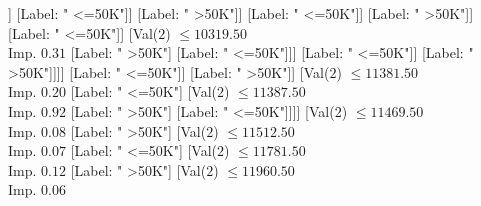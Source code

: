 \documentclass[margin=10pt]{standalone}
\begin{document}
\begin{forest}
																																[Val($2$) $ \leq 10352.50$ \\ Imp. $0.02$
																																	[Val($2$) $ \leq 10308.50$ \\ Imp. $0.10$
																																		[Val($2$) $ \leq 10254.50$ \\ Imp. $0.11$
																																			[Val($2$) $ \leq 10240.50$ \\ Imp. $0.14$
																																				[Val($2$) $ \leq 10143.50$ \\ Imp. $0.15$
																																					[Val($2$) $ \leq 10069.50$ \\ Imp. $0.20$
																																						[Val($2$) $ \leq 10026.50$ \\ Imp. $0.04$
																																							[Val($2$) $ \leq 9898.50$ \\ Imp. $0.31$
																																								[Label: " >50K"]
																																								[Label: " <=50K"]]
																																							[Label: " <=50K"]]
																																						[Label: " >50K"]]
																																					[Label: " <=50K"]]
																																				[Label: " >50K"]]
																																			[Label: " <=50K"]]
																																		[Val($2$) $ \leq 10319.50$ \\ Imp. $0.31$
																																			[Label: " >50K"]
																																			[Label: " <=50K"]]]
																																	[Label: " <=50K"]]
																																[Label: " >50K"]]]]
																													[Label: " <=50K"]]
																												[Label: " >50K"]]
																											[Val($2$) $ \leq 11381.50$ \\ Imp. $0.20$
																												[Label: " <=50K"]
																												[Val($2$) $ \leq 11387.50$ \\ Imp. $0.92$
																													[Label: " >50K"]
																													[Label: " <=50K"]]]]
																										[Val($2$) $ \leq 11469.50$ \\ Imp. $0.08$
																											[Label: " >50K"]
																											[Val($2$) $ \leq 11512.50$ \\ Imp. $0.07$
																												[Label: " <=50K"]
																												[Val($2$) $ \leq 11781.50$ \\ Imp. $0.12$
																													[Label: " >50K"]
																													[Val($2$) $ \leq 11960.50$ \\ Imp. $0.06$

\end{forest}
\end{document}
